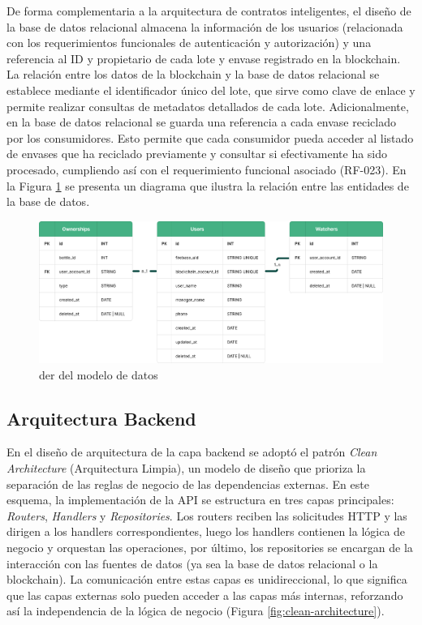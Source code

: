 De forma complementaria a la arquitectura de contratos inteligentes, el diseño de la base de datos relacional almacena la información de los usuarios (relacionada con los requerimientos funcionales de autenticación y autorización) y una referencia al ID y propietario de cada lote y envase registrado en la blockchain. La relación entre los datos de la blockchain y la base de datos relacional se establece mediante el identificador único del lote, que sirve como clave de enlace y permite realizar consultas de metadatos detallados de cada lote. Adicionalmente, en la base de datos relacional se guarda una referencia a cada envase reciclado por los consumidores. Esto permite que cada consumidor pueda acceder al listado de envases que ha reciclado previamente y consultar si efectivamente ha sido procesado, cumpliendo así con el requerimiento funcional asociado (RF-023). En la Figura \ref{fig:der} se presenta un diagrama que ilustra la relación entre las entidades de la base de datos.

\begin{figure}[!t]
    \centering
    \includegraphics[width=\textwidth]{Figures/db-der.png}
    \caption{\acrfull{der} del modelo de datos}
    \label{fig:der}
\end{figure}

\subsection{Arquitectura Backend}

En el diseño de arquitectura de la capa backend se adoptó el patrón \textit{Clean Architecture} (Arquitectura Limpia), un modelo de diseño que prioriza la separación de las reglas de negocio de las dependencias externas. En este esquema, la implementación de la API se estructura en tres capas principales: \textit{Routers}, \textit{Handlers} y \textit{Repositories}. Los routers reciben las solicitudes HTTP y las dirigen a los handlers correspondientes, luego los handlers contienen la lógica de negocio y orquestan las operaciones, por último, los repositories se encargan de la interacción con las fuentes de datos (ya sea la base de datos relacional o la blockchain). La comunicación entre estas capas es unidireccional, lo que significa que las capas externas solo pueden acceder a las capas más internas, reforzando así la independencia de la lógica de negocio (Figura \ref{fig:clean-architecture}).

